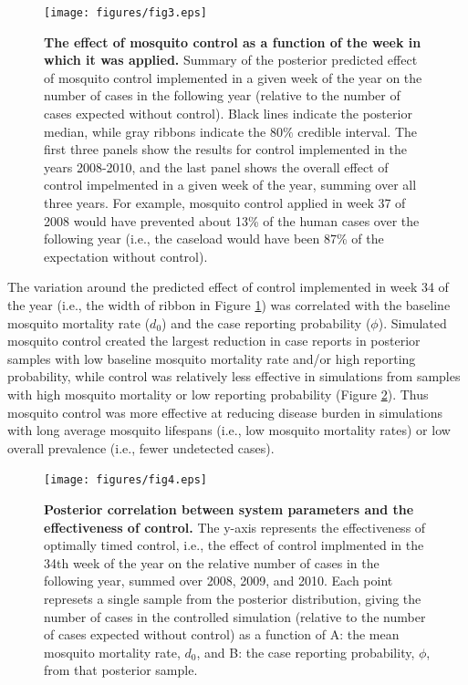 \documentclass[10pt,letterpaper]{article}
\begin{document}
\begin{figure}[!h]
\texttt{[image: figures/fig3.eps]}
\caption{{\bf The effect of mosquito control as a function of the week in which it was applied.}
Summary of the posterior predicted effect of mosquito control implemented in a given week of the year on the number of cases in the following year (relative to the number of cases expected without control).
Black lines indicate the posterior median, while gray ribbons indicate the $80\%$ credible interval.
The first three panels show the results for control implemented in the years 2008-2010, and the last panel shows the overall effect of control impelmented in a given week of the year, summing over all three years.
For example, mosquito control applied in week 37 of 2008 would have prevented about 13\% of the human cases over the following year (i.e., the caseload would have been 87\% of the expectation without control).
}
\label{control}
\end{figure}

The variation around the predicted effect of control implemented in week 34 of the year (i.e., the width of ribbon in Figure \ref{control}) was correlated with the baseline mosquito mortality rate ($d_0$) and the case reporting probability ($\phi$).
Simulated mosquito control created the largest reduction in case reports in posterior samples with low baseline mosquito mortality rate and/or high reporting probability, while control was relatively less effective in simulations from samples with high mosquito mortality or low reporting probability (Figure \ref{correlations}).
Thus mosquito control was more effective at reducing disease burden in simulations with long average mosquito lifespans (i.e., low mosquito mortality rates) or low overall prevalence (i.e., fewer undetected cases). 


\begin{figure}[!h]
\texttt{[image: figures/fig4.eps]}
\caption{{\bf Posterior correlation between system parameters and the effectiveness of control.}
The y-axis represents the effectiveness of optimally timed control, i.e., the effect of control implmented in the 34th week of the year on the relative number of cases in the following year, summed over 2008, 2009, and 2010.
Each point represets a single sample from the posterior distribution, giving the number of cases in the controlled simulation (relative to the number of cases expected without control) as a function of A: the mean mosquito mortality rate, $d_0$, and B: the case reporting probability, $\phi$, from that posterior sample.
}
\label{correlations}
\end{figure}
\end{document}
